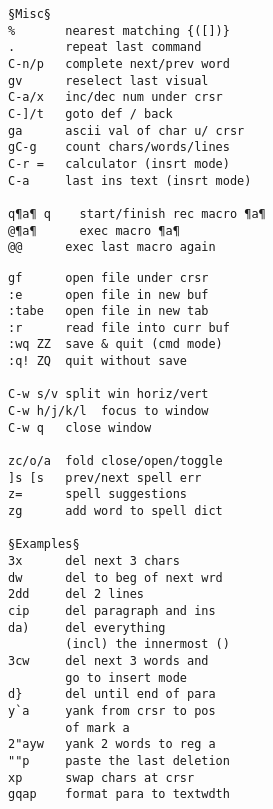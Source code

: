 \documentclass{article}
\begin{document}
\begin{multicols}{4}
\begin{lstlisting}
§Misc§
%       nearest matching {([])}
.       repeat last command
C-n/p   complete next/prev word
gv      reselect last visual
C-a/x   inc/dec num under crsr
C-]/t   goto def / back
ga      ascii val of char u/ crsr
gC-g    count chars/words/lines
C-r =   calculator (insrt mode)
C-a     last ins text (insrt mode)

q¶a¶ q    start/finish rec macro ¶a¶
@¶a¶      exec macro ¶a¶
@@      exec last macro again
\end{lstlisting}
\begin{lstlisting}
gf      open file under crsr
:e      open file in new buf
:tabe   open file in new tab
:r      read file into curr buf
:wq ZZ  save & quit (cmd mode)
:q! ZQ  quit without save

C-w s/v split win horiz/vert
C-w h/j/k/l  focus to window
C-w q   close window

zc/o/a  fold close/open/toggle
]s [s   prev/next spell err
z=      spell suggestions
zg      add word to spell dict

§Examples§
3x      del next 3 chars
dw      del to beg of next wrd
2dd     del 2 lines
cip     del paragraph and ins
da)     del everything
        (incl) the innermost ()
3cw     del next 3 words and
        go to insert mode
d}      del until end of para
y`a     yank from crsr to pos
        of mark a
2"ayw   yank 2 words to reg a
""p     paste the last deletion
xp      swap chars at crsr
gqap    format para to textwdth
\end{lstlisting}
\end{multicols}
\end{document}
